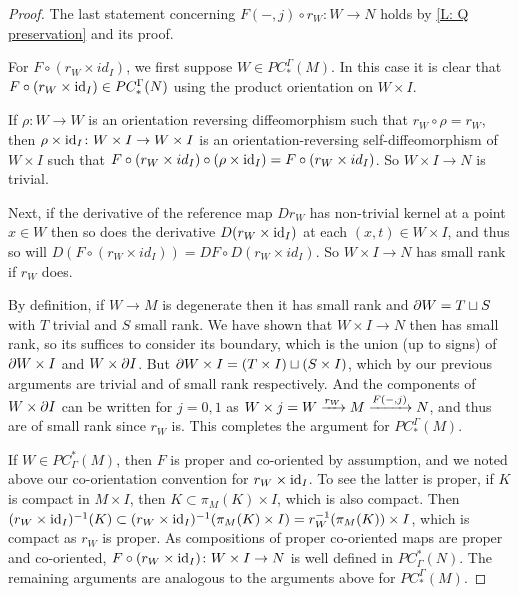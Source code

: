 \begin{proof}
	The last statement concerning $F(-,j) \circ r_W \colon W \to N$ holds by \cref{L: Q preservation} and its proof.

	For	$F \circ (r_W \times id_I)$, we first suppose $W \in PC_*^\Gamma(M)$.
	In this case it is clear that $F \circ (r_W \times \mathrm{id}_I) \in PC_*^\Gamma(N)$ using the product orientation on $W \times I$.

	If $\rho \colon W \to W$ is an orientation reversing diffeomorphism such that $r_W \circ \rho = r_W$, then
	$\rho \times \mathrm{id}_I \colon W \times I \to W \times I$ is an orientation-reversing self-diffeomorphism of $W \times I$ such that $F \circ (r_W \times id_I) \circ (\rho \times \mathrm{id}_I) = F \circ (r_W \times id_I)$.
	So $W \times I \to N$ is trivial.

	\begin{comment}
	\end{comment}

	Next, if the derivative of the reference map $Dr_W$ has non-trivial kernel at a point $x \in W$ then so does the derivative $D(r_W \times \mathrm{id}_I)$ at each $(x,t) \in W \times I$, and thus so
	will $D(F \circ (r_W \times id_I)) = DF \circ D(r_W \times id_I)$.
	So $W \times I \to N$ has small rank if $r_W$ does.

	By definition, if $W \to M$ is degenerate then it has small rank and $\partial W = T \sqcup S$ with $T$ trivial and $S$ small rank.
	We have shown that $W \times I \to N$ then has small rank, so its suffices to consider its boundary,
	which is the union (up to signs) of $\partial W \times I$ and $W \times \partial I$.
	But $\partial W \times I = (T \times I) \sqcup (S \times I)$, which by our previous
	arguments are trivial and of small rank respectively.
	And the components of $W \times \partial I$ can be written for $j = 0, 1$ as $W \times j = W \xrightarrow{r_W} M \xrightarrow{F(-,j)} N$, and thus are of small rank since $r_W$ is.
	This completes the argument for $PC_*^\Gamma(M)$. 
	
	If $W \in PC^*_\Gamma(M)$, then $F$ is proper and co-oriented by assumption, and we noted above our co-orientation convention for $r_W \times \mathrm{id}_I$.
	To see the latter is proper, if $K$ is compact in $M \times I$, then $K \subset \pi_M(K) \times I$, which is also compact.
	Then $(r_W \times \mathrm{id}_I)^{-1}(K) \subset (r_W \times \mathrm{id}_I)^{-1}(\pi_M(K) \times I) = r_W^{-1}(\pi_M(K)) \times I$, which is compact as $r_W$ is proper.
	As compositions of proper co-oriented maps are proper and co-oriented, $F \circ (r_W \times \mathrm{id}_I) \colon W \times I \to N$ is well defined in $PC^*_\Gamma(N)$.
	The remaining arguments are analogous to the arguments above for $PC_*^\Gamma(M)$.
\end{proof}

